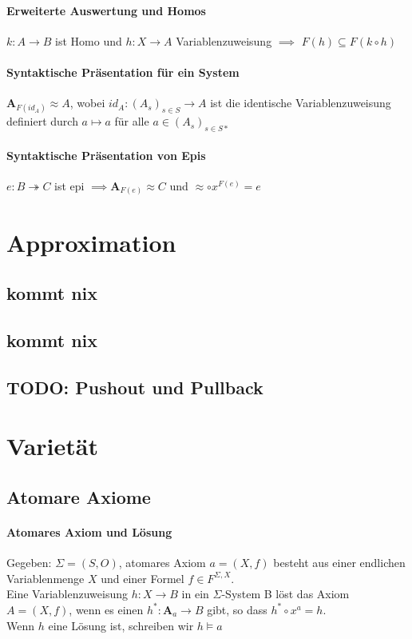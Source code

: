 \paragraph{ Erweiterte Auswertung und Homos}
$k: A \rightarrow B$ ist Homo und $h: X \rightarrow A$ Variablenzuweisung $\implies $ $F(h) \subseteq F(k \circ h)$

\paragraph{ Syntaktische Präsentation für ein System}
$\mathbf{A}_{F(id_A)} \approx A$, wobei $id_A: (A_s)_{s \in S} \rightarrow A$ ist die identische Variablenzuweisung definiert durch $a \mapsto a$ für alle $a \in (A_s)_{s \in S*}$

\paragraph{ Syntaktische Präsentation von Epis}
$e: B \twoheadrightarrow C$ ist epi $\implies \mathbf{A}_{F(e)} \approx C$ und $\approx \circ x^{F(e)} = e$


\section{Approximation}
\subsection{kommt nix}
\subsection{kommt nix}
\subsection{TODO: Pushout und Pullback}



\section{Varietät}

\subsection{Atomare Axiome}

\paragraph{ Atomares Axiom und Lösung}
Gegeben: $\Sigma = (S,O)$, atomares Axiom $a = (X, f)$ besteht aus einer endlichen Variablenmenge $X$ und einer Formel $f \in F^{\Sigma, X}$. \\
Eine Variablenzuweisung $h: X \rightarrow B$ in ein $\Sigma$-System B löst das Axiom $A = (X, f)$, wenn es einen \homo $h^*: \mathbf{A}_a \rightarrow B$ gibt, so dass $h^* \circ x^a = h$. \\
Wenn $h$ eine Lösung ist, schreiben wir $h \models a$

